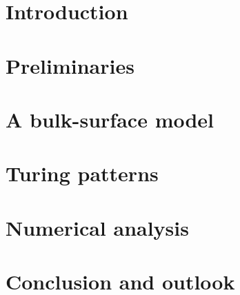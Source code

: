\documentclass[oneside]{book}
\begin{document}
\chapter{Introduction}


\mainmatter

\chapter{Preliminaries}
\label{ch:Preliminaries}


\chapter{A bulk-surface model}
\label{ch:Bulk_surface_model}


\chapter{Turing patterns}
\label{ch:Turing_patterns}


\chapter{Numerical analysis}
\label{ch:Numerical_Analysis}


\backmatter

\chapter{Conclusion and outlook}




\end{document}
